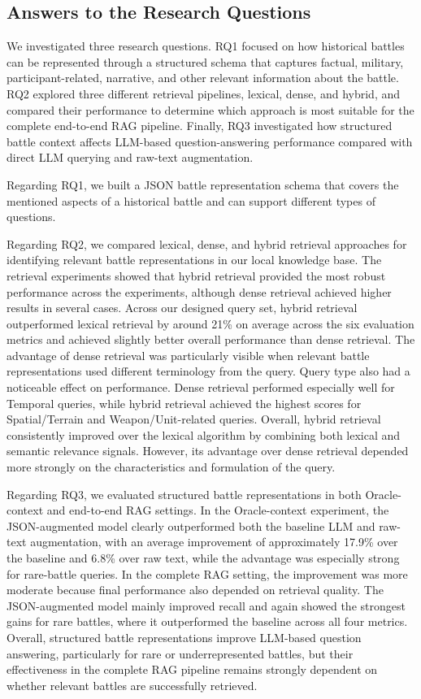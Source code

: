 \subsection{Answers to the Research Questions}
We investigated three research questions. RQ1 focused on how historical battles can be represented through a structured schema that captures factual, military, participant-related, narrative, and other relevant information about the battle. RQ2 explored three different retrieval pipelines, lexical, dense, and hybrid, and compared their performance to determine which approach is most suitable for the complete end-to-end RAG pipeline. Finally, RQ3 investigated how structured battle context affects LLM-based question-answering performance compared with direct LLM querying and raw-text augmentation.

Regarding RQ1, we built a JSON battle representation schema that covers the mentioned aspects of a historical battle and can support different types of questions.

Regarding RQ2, we compared lexical, dense, and hybrid retrieval approaches for identifying relevant battle representations in our local knowledge base. The retrieval experiments showed that hybrid retrieval provided the most robust performance across the experiments, although dense retrieval achieved higher results in several cases. Across our designed query set, hybrid retrieval outperformed lexical retrieval by around 21\% on average across the six evaluation metrics and achieved slightly better overall performance than dense retrieval. The advantage of dense retrieval was particularly visible when relevant battle representations used different terminology from the query. Query type also had a noticeable effect on performance. Dense retrieval performed especially well for Temporal queries, while hybrid retrieval achieved the highest scores for Spatial/Terrain and Weapon/Unit-related queries. Overall, hybrid retrieval consistently improved over the lexical algorithm by combining both lexical and semantic relevance signals. However, its advantage over dense retrieval depended more strongly on the characteristics and formulation of the query.

Regarding RQ3, we evaluated structured battle representations in both Oracle-context and end-to-end RAG settings. In the Oracle-context experiment, the JSON-augmented model clearly outperformed both the baseline LLM and raw-text augmentation, with an average improvement of approximately 17.9\% over the baseline and 6.8\% over raw text, while the advantage was especially strong for rare-battle queries. In the complete RAG setting, the improvement was more moderate because final performance also depended on retrieval quality. The JSON-augmented model mainly improved recall and again showed the strongest gains for rare battles, where it outperformed the baseline across all four metrics. Overall, structured battle representations improve LLM-based question answering, particularly for rare or underrepresented battles, but their effectiveness in the complete RAG pipeline remains strongly dependent on whether relevant battles are successfully retrieved.
